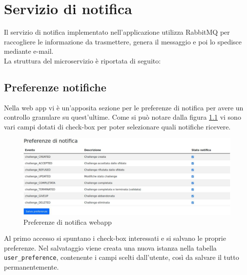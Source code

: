 \chapter{Servizio di notifica}\label{service}

Il servizio di notifica implementato nell'applicazione utilizza RabbitMQ per raccogliere le informazione da trasmettere, genera il messaggio e poi lo spedisce mediante e-mail.\\
La struttura del microservizio è riportata di seguito:
\begin{flushleft}
\end{flushleft}

\section{Preferenze notifiche}

Nella web app vi è un'apposita sezione per le preferenze di notifica per avere un controllo granulare su quest'ultime. Come si può notare dalla figura \ref{fig:prefnot} vi sono vari campi dotati di check-box per poter selezionare quali notifiche ricevere.

\begin{figure}[H]
    \centering
    \includegraphics[width=1\textwidth]{images/preferenze-notifica.pdf}
    \caption{Preferenze di notifica webapp}
    \label{fig:prefnot}
\end{figure}

Al primo accesso si spuntano i check-box interessati e si salvano le proprie preferenze. Nel salvataggio viene creata una nuova istanza nella tabella \texttt{user\_preference}, contenente i campi scelti dall'utente, così da salvare il tutto permanentemente.

